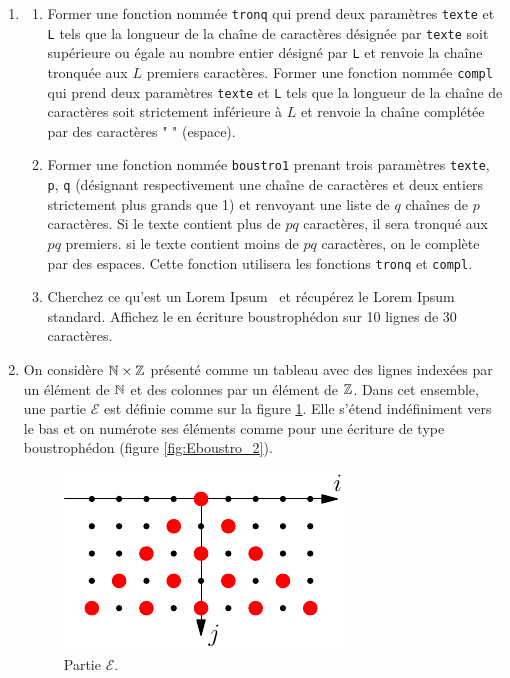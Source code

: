 \begin{enumerate}
 \item 
\begin{enumerate}
 \item Former une fonction nommée \verb|tronq| qui prend deux paramètres \verb|texte| et \verb|L| tels que la longueur de la chaîne de caractères désignée par \verb|texte| soit supérieure ou égale au nombre entier désigné par \verb|L| et renvoie la chaîne tronquée aux $L$ premiers caractères.\newline
 Former une fonction nommée \verb|compl| qui prend deux paramètres \verb|texte| et \verb|L| tels que la longueur de la chaîne de caractères soit strictement inférieure à $L$ et renvoie la chaîne complétée par des caractères " " (espace). 

 \item  Former une fonction nommée \verb|boustro1| prenant trois paramètres \verb|texte|, \verb|p|, \verb|q| (désignant respectivement une chaîne de caractères et deux entiers strictement plus grands que 1) et renvoyant une liste de $q$ chaînes de $p$ caractères. Si le texte contient plus de $pq$ caractères, il sera tronqué aux $pq$ premiers. si le texte contient moins de $pq$ caractères, on le complète par des espaces. Cette fonction utilisera les fonctions \verb|tronq| et \verb|compl|. 

 \item Cherchez ce qu'est un \og Lorem Ipsum \fg \ et récupérez le Lorem Ipsum standard. Affichez le en écriture boustrophédon sur 10 lignes de 30 caractères.
 \end{enumerate}

\item On considère $\mathbb{N} \times \mathbb{Z}$ présenté comme un tableau avec des lignes indexées par un élément de $\mathbb{N}$ et des colonnes par un élément de $\mathbb{Z}$. Dans cet ensemble, une partie $\mathcal{E}$ est définie comme sur la figure \ref{fig:Eboustro_1}. Elle s'étend indéfiniment vers le bas et on numérote ses éléments comme pour une écriture de type boustrophédon (figure \ref{fig:Eboustro_2}).

\begin{figure}
  \centering
  \includegraphics{./Eboustro_1_fig.pdf}
  \caption{Partie $\mathcal{E}$.}
  \label{fig:Eboustro_1}
\end{figure}


\end{enumerate}
